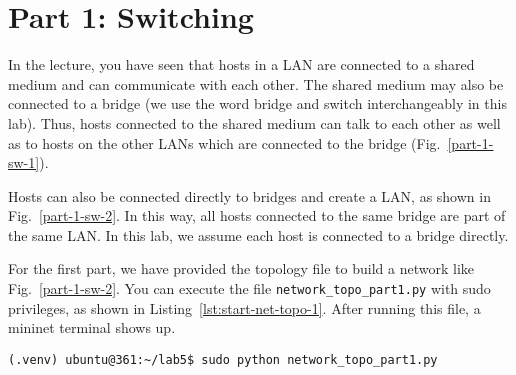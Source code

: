 \documentclass[11pt]{article}
\begin{document}


\section{Part 1: Switching}
\label{sec:exercise1}


In the lecture, you have seen that hosts in a LAN are connected to a shared medium and can communicate with each other. The shared medium may also be connected to a bridge (we use the word bridge and switch interchangeably in this lab).
Thus, hosts connected to the shared medium can talk to each other as well as to hosts on the other LANs which are connected to the bridge (Fig.~\ref{part-1-sw-1}). 


Hosts can also be connected directly to bridges and create a LAN, as shown in Fig.~\ref{part-1-sw-2}. In this way, all hosts connected to the same bridge are part of the same LAN. In this lab, we assume each host is connected to a bridge directly.


For the first part, we have provided the topology file to build a network like Fig.~\ref{part-1-sw-2}. You can execute the file \texttt{network\_topo\_part1.py} with sudo privileges, as shown in Listing~\ref{lst:start-net-topo-1}. After running this file, a mininet terminal shows up.


\begin{lstlisting}[style=ece361shell, caption={Execute the the network topology file to create the virtual network}, label={lst:start-net-topo-1}]
(.venv) ubuntu@361:~/lab5$ sudo python network_topo_part1.py
\end{lstlisting}
\end{document}

